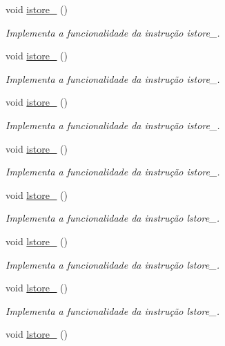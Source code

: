 \begin{DoxyCompactItemize}
void \hyperlink{classOperations_ae0a17c510b570467f5b025e3dcbe1398}{istore\+\_} ()
\begin{DoxyCompactList}\small\item\em Implementa a funcionalidade da instrução istore\+\_. \end{DoxyCompactList}\item 
void \hyperlink{classOperations_aeb89677195b16d5c595ec9faaddc2c76}{istore\+\_} ()
\begin{DoxyCompactList}\small\item\em Implementa a funcionalidade da instrução istore\+\_. \end{DoxyCompactList}\item 
void \hyperlink{classOperations_a0fbc901b4c88aef8455b30d9b2063447}{istore\+\_} ()
\begin{DoxyCompactList}\small\item\em Implementa a funcionalidade da instrução istore\+\_. \end{DoxyCompactList}\item 
void \hyperlink{classOperations_a3ff20f0475eaaa28501ea330074f5cb7}{istore\+\_} ()
\begin{DoxyCompactList}\small\item\em Implementa a funcionalidade da instrução istore\+\_. \end{DoxyCompactList}\item 
void \hyperlink{classOperations_ae3c949d56a3ee685668134493595334b}{lstore\+\_} ()
\begin{DoxyCompactList}\small\item\em Implementa a funcionalidade da instrução lstore\+\_. \end{DoxyCompactList}\item 
void \hyperlink{classOperations_aa162cef00367e3d5fb5dca12494a5793}{lstore\+\_} ()
\begin{DoxyCompactList}\small\item\em Implementa a funcionalidade da instrução lstore\+\_. \end{DoxyCompactList}\item 
void \hyperlink{classOperations_a178660c2b3ca2625c140daf867531386}{lstore\+\_} ()
\begin{DoxyCompactList}\small\item\em Implementa a funcionalidade da instrução lstore\+\_. \end{DoxyCompactList}\item 
void \hyperlink{classOperations_a00d5ca7ea5a68e9cccfdc26b11a716bf}{lstore\+\_} ()

\end{DoxyCompactItemize}
